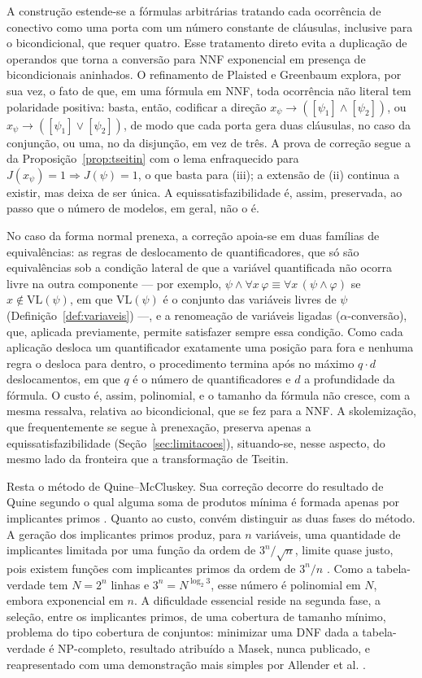 \documentclass[12pt,a4paper,oneside]{report}
\theoremstyle{tituloplain}
\theoremstyle{titulodef}
\begin{document}
A construção estende-se a fórmulas arbitrárias tratando cada ocorrência de conectivo como uma porta com um número constante de cláusulas, inclusive para o bicondicional, que requer quatro. Esse tratamento direto evita a duplicação de operandos que torna a conversão para NNF exponencial em presença de bicondicionais aninhados. O refinamento de Plaisted e Greenbaum \cite{plaisted1986} explora, por sua vez, o fato de que, em uma fórmula em NNF, toda ocorrência não literal tem polaridade positiva: basta, então, codificar a direção $x_\psi\rightarrow([\psi_1]\wedge[\psi_2])$, ou $x_\psi\rightarrow([\psi_1]\vee[\psi_2])$, de modo que cada porta gera duas cláusulas, no caso da conjunção, ou uma, no da disjunção, em vez de três. A prova de correção segue a da Proposição~\ref{prop:tseitin} com o lema enfraquecido para $J(x_\psi)=1\Rightarrow J(\psi)=1$, o que basta para (iii); a extensão de (ii) continua a existir, mas deixa de ser única. A equissatisfazibilidade é, assim, preservada, ao passo que o número de modelos, em geral, não o é.
 
No caso da forma normal prenexa, a correção apoia-se em duas famílias de equivalências: as regras de deslocamento de quantificadores, que só são equivalências sob a condição lateral de que a variável quantificada não ocorra livre na outra componente — por exemplo, $\psi\wedge\forall x\,\varphi\equiv\forall x\,(\psi\wedge\varphi)$ se $x\notin\mathrm{VL}(\psi)$, em que $\mathrm{VL}(\psi)$ é o conjunto das variáveis livres de $\psi$ (Definição~\ref{def:variaveis}) —, e a renomeação de variáveis ligadas ($\alpha$-conversão), que, aplicada previamente, permite satisfazer sempre essa condição. Como cada aplicação desloca um quantificador exatamente uma posição para fora e nenhuma regra o desloca para dentro, o procedimento termina após no máximo $q\cdot d$ deslocamentos, em que $q$ é o número de quantificadores e $d$ a profundidade da fórmula. O custo é, assim, polinomial, e o tamanho da fórmula não cresce, com a mesma ressalva, relativa ao bicondicional, que se fez para a NNF. A skolemização, que frequentemente se segue à prenexação, preserva apenas a equissatisfazibilidade (Seção~\ref{sec:limitacoes}), situando-se, nesse aspecto, do mesmo lado da fronteira que a transformação de Tseitin.
 
Resta o método de Quine--McCluskey. Sua correção decorre do resultado de Quine segundo o qual alguma soma de produtos mínima é formada apenas por implicantes primos \cite{quine1952,mccluskey1956}. Quanto ao custo, convém distinguir as duas fases do método. A geração dos implicantes primos produz, para $n$ variáveis, uma quantidade de implicantes limitada por uma função da ordem de $3^n/\sqrt{n}$, limite quase justo, pois existem funções com implicantes primos da ordem de $3^n/n$ \cite{chandra1978}. Como a tabela-verdade tem $N=2^n$ linhas e $3^n=N^{\log_2 3}$, esse número é polinomial em $N$, embora exponencial em $n$. A dificuldade essencial reside na segunda fase, a seleção, entre os implicantes primos, de uma cobertura de tamanho mínimo, problema do tipo cobertura de conjuntos: minimizar uma DNF dada a tabela-verdade é NP-completo, resultado atribuído a Masek, nunca publicado, e reapresentado com uma demonstração mais simples por Allender et al. \cite{allender2006}.
 
\end{document}
